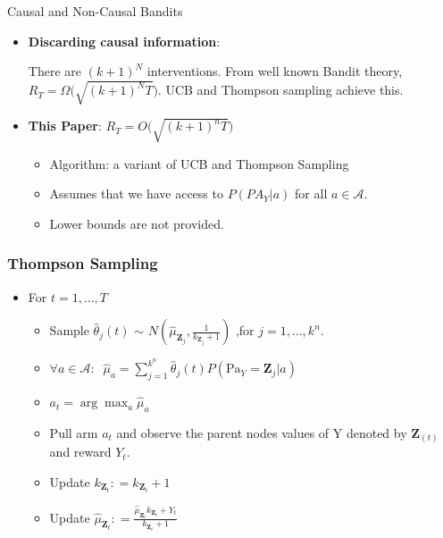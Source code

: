 \documentclass{beamer}
\begin{document}
\begin{frame}{Causal and Non-Causal Bandits}
	\begin{itemize}
		\item \textbf{Discarding causal information}: 
		
		There are $(k+1)^N$ interventions. From well known Bandit theory, $R_T = \Omega \Big(\sqrt{(k+1)^N T}\Big)$. UCB and Thompson sampling achieve this.
		
		\item \textbf{This Paper}: $R_T = O \Big(\sqrt{(k+1)^n T}\Big)$ 
		
		
		\begin{itemize}
			\item Algorithm: a variant of UCB and Thompson Sampling
			\item Assumes that we have access to $P(PA_Y|a)$ for all $a \in \mathcal{A}$.
			\item Lower bounds are not provided.
		\end{itemize}

	\end{itemize}
\end{frame}


\begin{frame}
\frametitle{Thompson Sampling}
	
	\begin{itemize}
		\item[] For $t = 1,\ldots,T$ 
					\vspace{0.2cm}
		\begin{itemize}
			\item Sample $\hat{\theta}_j(t)$ $\sim$ $N(\hat{\mu}_{\mathbf{Z}_j},\frac{1}{k_{\mathbf{Z}_j}+1})$ ,for $j = 1,\ldots,k^n$.
			\vspace{0.2cm}
			\item $\forall a\in\mathcal{A}:\;\;\hat{\mu}_a = \sum_{j=1}^{k^n}\hat{\theta}_j(t)P(\text{Pa}_Y=\mathbf{Z}_j|a)$
						\vspace{0.2cm}
			\item $a_t = \arg\max_a \hat{\mu}_a$	
						\vspace{0.2cm}
			\item Pull arm $a_t$ and observe the parent nodes values of Y denoted by
			 $\mathbf{Z}_{(t)}$ and reward $Y_t$. 
			 			\vspace{0.2cm}
			\item Update $k_{\mathbf{Z}_t}: = k_{\mathbf{Z}_t}+1$
						\vspace{0.2cm}
			\item Update $\hat{\mu}_{\mathbf{Z}_t}: = \frac{\hat{\mu}_{\mathbf{Z}_t}k_{\mathbf{Z}_t}+Y_t}{k_{\mathbf{Z}_t}+1}$
		\end{itemize}
	\end{itemize}	
\end{frame}
\end{document}
